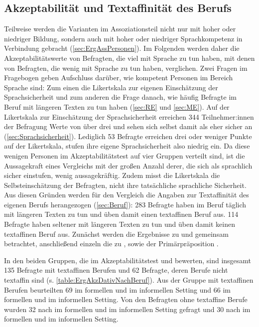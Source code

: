 \subsection{Akzeptabilität und Textaffinität des Berufs}
\label{sec:ErgAkzNachBeruf}
Teilweise werden die Varianten im Assoziationsteil nicht nur mit hoher oder niedriger Bildung, sondern auch mit hoher oder niedriger Sprachkompetenz in Verbindung gebracht (\autoref{sec:ErgAssPersonen}). 
Im Folgenden werden daher die Akzeptabilitätswerte von Befragten, die viel mit Sprache zu tun haben, mit denen von Befragten, die wenig mit Sprache zu tun haben, verglichen. 
Zwei Fragen im Fragebogen geben Aufschluss darüber, wie kompetent Personen im Bereich Sprache sind: 
Zum einen die Likertskala zur eigenen Einschätzung der Sprachsicherheit und zum anderen die Frage danach, wie häufig Befragte im Beruf mit längeren Texten zu tun haben (\autoref{sec:RE} und \autoref{sec:ME}). 
Auf der Likertskala zur Einschätzung der Sprachsicherheit erreichen 344 Teilnehmer:innen der Befragung Werte von über drei und sehen sich selbst damit als eher sicher an (\autoref{sec:Sprachsicherheit}). 
Lediglich 53 Befragte erreichen drei oder weniger Punkte auf der Likertskala, stufen ihre eigene Sprachsicherheit also niedrig ein. 
Da diese wenigen Personen im Akzeptabilitätstest auf vier Gruppen verteilt sind, ist die Aussagekraft eines Vergleichs mit der großen Anzahl derer, die sich als sprachlich sicher einstufen, wenig aussagekräftig. 
Zudem misst die Likertskala die Selbsteinschätzung der Befragten, nicht ihre tatsächliche sprachliche Sicherheit. 
Aus diesen Gründen werden für den Vergleich die Angaben zur Textaffinität des eigenen Berufs herangezogen (\autoref{sec:Beruf}): 
283 Befragte haben im Beruf täglich mit längeren Texten zu tun und üben damit einen textaffinen Beruf aus. 
114 Befragte haben seltener mit längeren Texten zu tun und üben damit keinen textaffinen Beruf aus. 
Zunächst werden die Ergebnisse zu \wegen{} und \waehrend{} gemeinsam betrachtet, anschließend einzeln die zu \dank{}, \gegenueber{} sowie der Primärpräposition . 

In den beiden Gruppen, die im Akzeptabilitätstest \wegen{} und \waehrend{} bewerten, sind insgesamt 135 Befragte mit textaffinen Berufen und 62 Befragte, deren Berufe nicht textaffin sind (s. \autoref{table:ErgAkzDativNachBeruf}). 
Aus der Gruppe mit textaffinen Berufen beurteilten 69 \wegen{} im formellen und \waehrend{} im informellen Setting und 66 \waehrend{} im formellen und \wegen{} im informellen Setting. 
Von den Befragten ohne textaffine Berufe wurden 32 nach \wegen{} im formellen und \waehrend{} im informellen Setting gefragt und 30 nach \waehrend{} im formellen und \wegen{} im informellen Setting. 


